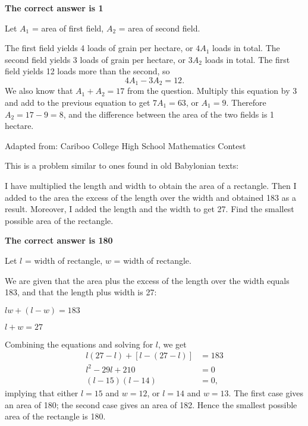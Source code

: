 \documentclass{article}
\begin{document}
\textbf{The correct answer is 1}

Let $A_1$ = area of first field, $A_2$ = area of second field.

The first field yields 4 loads of grain per hectare, or $4A_1$ loads in total. The second field yields 3 loads of grain per hectare, or $3A_2$ loads in total. The first field yields 12 loads more than the second, so
\[
4A_1 - 3A_2 = 12.
\]
We also know that $A_1 + A_2 = 17$ from the question. Multiply this equation by 3 and add to the previous equation to get $7A_1 = 63$, or $A_1 = 9$. Therefore $A_2 = 17-9 = 8$, and the difference between the area of the two fields is 1 hectare.

\vskip 1.5cm


\scriptsize
Adapted from: Cariboo College High School Mathematics Contest

\normalsize
This is a problem similar to ones found in old Babylonian texts:

I have multiplied the length and width to obtain the area of a rectangle. Then I added to the area the excess of the length over the width and obtained 183 as a result. Moreover, I added the length and the width to get 27. Find the smallest possible area of the rectangle.

\textbf{The correct answer is 180}

Let $l$ = width of rectangle, $w$ = width of rectangle.

We are given that the area plus the excess of the length over the width equals 183, and that the length plus width is 27:

\begin{minipage}{0.5\textwidth}
	\centering
	$lw+(l-w)=183$
\end{minipage}
\begin{minipage}{0.49\textwidth}
	\centering
	$l+w=27$
\end{minipage}

Combining the equations and solving for $l$, we get
\begin{align*}
l(27-l)+[l-(27-l)] &= 183\\
l^2-29l+210 &= 0\\
(l-15)(l-14) &= 0,
\end{align*}
implying that either $l=15$ and $w=12$, or $l=14$ and $w=13$. The first case gives an area of 180; the second case gives an area of 182. Hence the smallest possible area of the rectangle is 180.
\end{document}
